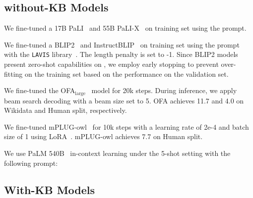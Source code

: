 \documentclass[11pt]{article}
\begin{document}
\subsection{without-KB Models}
We fine-tuned a 17B PaLI~\cite{chen2022pali} and 55B PaLI-X~\cite{chen2023pali} on \ourdataset training set using the  prompt.

We fine-tuned a BLIP2~\cite{li2023blip} and InstructBLIP~\cite{dai2023instructblip} on \ourdataset training set using the  prompt with the \texttt{LAVIS} library~\citep{li-etal-2023-lavis}. The length penalty is set to -1.
Since BLIP2 models present zero-shot capabilities on \ourdataset, we employ early stopping to prevent over-fitting on the training set based on the performance on the validation set.

We fine-tuned the OFA$_\text{large}$~\cite{lu2022unified} model for 20k steps. During inference, we apply beam search decoding with a beam size set to 5. OFA achieves 11.7 and 4.0 on \ourdataset Wikidata and Human split, respectively.

We fine-tuned mPLUG-owl~\citep{ye2023mplug} for 10k steps with a learning rate of 2e-4 and batch size of 1 using LoRA~\citep{hu2021lora}. mPLUG-owl achieves 7.7 on \ourdataset Human split.

We use PaLM 540B~\cite{chowdhery2022palm} in-context learning under the 5-shot setting with the following prompt:

\noindent{}

\subsection{With-KB Models}
\end{document}
